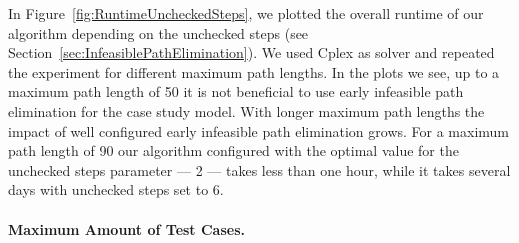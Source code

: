 \documentclass[runningheads,a4paper]{llncs}%
\begin{document}
In Figure~\ref{fig:RuntimeUncheckedSteps}, we plotted the overall runtime of our
algorithm depending on the unchecked steps (see
Section~\ref{sec:InfeasiblePathElimination}). We used Cplex as solver and
repeated the experiment for different maximum path lengths. In the plots we see,
up to a maximum path length of 50 it is not beneficial to use early infeasible
path elimination for the case study model. With longer maximum path lengths the
impact of well configured early infeasible path elimination grows. For a maximum
path length of 90 our algorithm configured with the optimal value for the
unchecked steps parameter --- 2 --- takes less than one hour, while it takes
several days with unchecked steps set to 6.%
%
\paragraph{Maximum Amount of Test Cases.}
\end{document}
